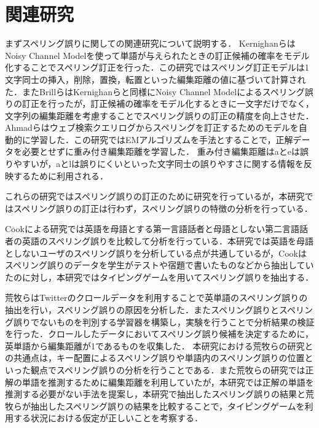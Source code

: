 \chapter{関連研究}
まずスペリング誤りに関しての関連研究について説明する．
KernighanらはNoisy Channel Modelを使って単語が与えられたときの訂正候補の確率をモデル化することでスペリング訂正を行った\cite{kernighan1990spelling}．この研究ではスペリング訂正モデルは1文字同士の挿入，削除，置換，転置といった編集距離の値に基づいて計算された．またBrillらはKernighanらと同様にNoisy Channel Modelによるスペリング誤りの訂正を行ったが，訂正候補の確率をモデル化するときに一文字だけでなく，文字列の編集距離を考慮することでスペリング誤りの訂正の精度を向上させた\cite{brill2000improved}．
Ahmadらはウェブ検索クエリログからスペリングを訂正するためのモデルを自動的に学習した\cite{ahmad2005learning}．この研究ではEMアルゴリズムを手法とすることで，正解データを必要とせずに重み付き編集距離を学習した．
重み付き編集距離はaとeは誤りやすいが，aとlは誤りにくいといった文字同士の誤りやすさに関する情報を反映するために利用される．
\begin{comment}
Ahmadらはまず重み付けされていないモデルを用いて誤りを検出し，その誤りを用いてモデルの重み付けを更新することで学習を行った．
\end{comment}
これらの研究ではスペリング誤りの訂正のために研究を行っているが，本研究ではスペリング誤りの訂正は行わず，スペリング誤りの特徴の分析を行っている．

Cookによる研究\cite{cook1997l2}では英語を母語とする第一言語話者と母語としない第二言語話者の英語のスペリング誤りを比較して分析を行っている．本研究では英語を母語としないユーザのスペリング誤りを分析している点が共通しているが，Cookはスペリング誤りのデータを学生がテストや宿題で書いたものなどから抽出していたのに対し，本研究ではタイピングゲームを用いてスペリング誤りを抽出する．

荒牧らはTwitterのクロールデータを利用することで英単語のスペリング誤りの抽出を行い，スペリング誤りの原因を分析した\cite{aramakiNLP2010}．またスペリング誤りとスペリング誤りでないものを判別する学習器を構築し，実験を行うことで分析結果の検証を行った．クロールしたデータにおいてスペリング誤り候補を決定するために，英単語から編集距離が1であるものを収集した．
本研究における荒牧らの研究との共通点は，キー配置によるスペリング誤りや単語内のスペリング誤りの位置といった観点でスペリング誤りの分析を行うことである．また荒牧らの研究では正解の単語を推測するために編集距離を利用していたが，本研究では正解の単語を推測する必要がない手法を提案し，本研究で抽出したスペリング誤りの結果と荒牧らが抽出したスペリング誤りの結果を比較することで，タイピングゲームを利用する状況における仮定が正しいことを考察する．

